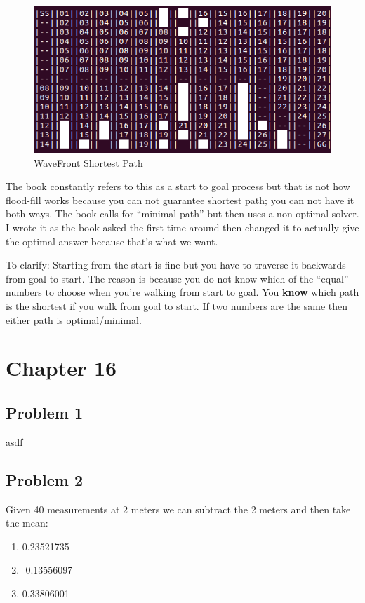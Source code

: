 \documentclass{article}
\begin{document}
\begin{figure}[h]
    \centering
    \includegraphics[scale=2.5]{problem11_3_2}
    \caption{WaveFront Shortest Path}
    \label{fig:p11_3_2}
\end{figure}

The book constantly refers to this as a start to goal process but that is not 
how flood-fill works because you can not guarantee shortest path; you can not 
have it both ways. The book calls for ``minimal path'' but then uses a 
non-optimal solver. I wrote it as the book asked the first time around then 
changed it to actually give the optimal answer because that's what we want.

To clarify: Starting from the start is fine but you have to traverse it 
backwards from goal to start. The reason is because you do not know which of the 
``equal'' numbers to choose when you're walking from start to goal. You 
\textbf{know} which path is the shortest if you walk from goal to start. If two 
numbers are the same then either path is optimal/minimal.

\newpage
\section{\textbf{Chapter 16}}
\subsection{Problem 1}
asdf

\subsection{Problem 2}
Given 40 measurements at 2 meters we can subtract the 2 meters and then take 
the mean:

\begin{enumerate}[label=\Alph*]
    \item 0.23521735
    \item -0.13556097
    \item 0.33806001
\end{enumerate}
\end{document}
